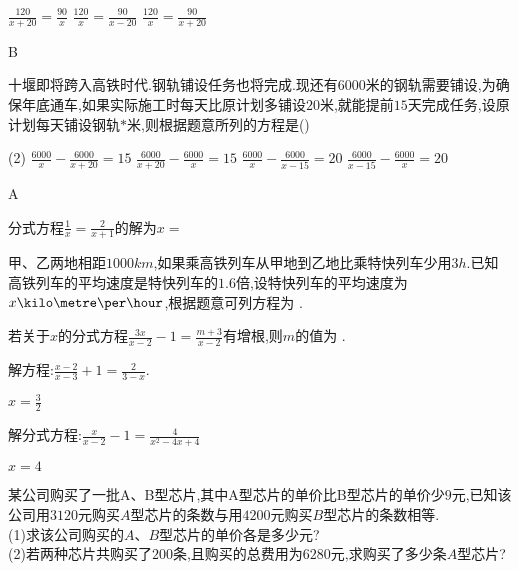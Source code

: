 \documentclass[cn,blue,12pt]{elegantbook}
\renewcommand \tkt[1]{{\CJKunderline[hidden=true, skip=true, thickness=1pt]{#1}}}
\begin{document}
\begin{shiti}
\begin{shiti}
\begin{tasks}
            \task \(\frac{120}{x+20}=\frac{90}{x}\)
            \task \(\frac{120}{x}=\frac{90}{x-20}\)
            \task \(\frac{120}{x}=\frac{90}{x+20}\)
        \end{tasks}
\begin{solution}
            B
\end{solution}
    \item 十堰即将跨入高铁时代.钢轨铺设任务也将完成.现还有\(6000\)米的钢轨需要铺设,为确保年底通车,如果实际施工时每天比原计划多铺设\(20\)米,就能提前\(15\)天完成任务,设原计划每天铺设钢轨\(*\)米,则根据题意所列的方程是(\qquad)\\
        \begin{tasks}(2)
            \task \(\frac{6000}{x}-\frac{6000}{x+20}=15\)
            \task \(\frac{6000}{x+20}-\frac{6000}{x}=15\)
            \task \(\frac{6000}{x}-\frac{6000}{x-15}=20\)
            \task \(\frac{6000}{x-15}-\frac{6000}{x}=20\)
        \end{tasks}
\begin{solution}
            A
\end{solution}
    \item 分式方程\(\frac{1}{x}=\frac{2}{x+1}\)的解为\(x =\)\tkt{\(1\)}
    \item 甲、乙两地相距\(1000 km\),如果乘高铁列车从甲地到乙地比乘特快列车少用\(3 h.\)已知高铁列车的平均速度是特快列车的\(1.6\)倍,设特快列车的平均速度为\(x \kilo\metre\per\hour \),根据题意可列方程为\tkt{\(\frac{1000}{x}-\frac{1000}{1.6x}=3\)}  .
    \item 若关于\(x\)的分式方程\(\frac{3x}{x-2}-1=\frac{m+3}{x-2}\)有增根,则\(m\)的值为\tkt{\(3\)} .
    \item 解方程:\(\frac{x-2}{x-3}+1=\frac{2}{3-x}\).
\begin{solution}
            \(x=\frac{3}{2}\)
\end{solution}
    \item 解分式方程:\(\frac{x}{x-2}-1=\frac{4}{x^2-4x+4}\)
\begin{solution}
            \(x=4\)
\end{solution}
    \item 某公司购买了一批A、B型芯片,其中A型芯片的单价比B型芯片的单价少\(9\)元,已知该公司用\(3120\)元购买\(A\)型芯片的条数与用\(4200\)元购买\(B\)型芯片的条数相等.\\
        (1)求该公司购买的\(A、B\)型芯片的单价各是多少元?\\
        (2)若两种芯片共购买了\( 200\)条,且购买的总费用为\(6280\)元,求购买了多少条\(A\)型芯片?
\begin{solution}

\end{solution}
\end{shiti}
\end{shiti}
\end{document}
